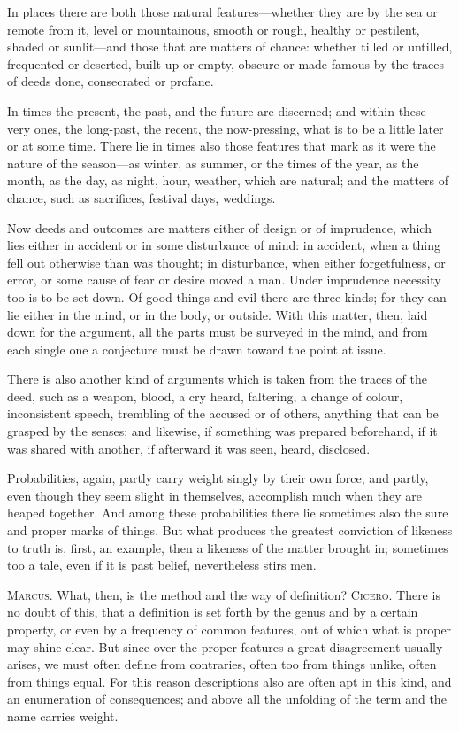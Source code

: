  In places there are both those natural features—whether they are by the sea or remote from it, level or mountainous, smooth or rough, healthy or pestilent, shaded or sunlit—and those that are matters of chance: whether tilled or untilled, frequented or deserted, built up or empty, obscure or made famous by the traces of deeds done, consecrated or profane.

 In times the present, the past, and the future are discerned; and within these very ones, the long-past, the recent, the now-pressing, what is to be a little later or at some time. There lie in times also those features that mark as it were the nature of the season—as winter, as summer, or the times of the year, as the month, as the day, as night, hour, weather, which are natural; and the matters of chance, such as sacrifices, festival days, weddings.

 Now deeds and outcomes are matters either of design or of imprudence, which lies either in accident or in some disturbance of mind: in accident, when a thing fell out otherwise than was thought; in disturbance, when either forgetfulness, or error, or some cause of fear or desire moved a man. Under imprudence necessity too is to be set down. Of good things and evil there are three kinds; for they can lie either in the mind, or in the body, or outside. With this matter, then, laid down for the argument, all the parts must be surveyed in the mind, and from each single one a conjecture must be drawn toward the point at issue.

 There is also another kind of arguments which is taken from the traces of the deed, such as a weapon, blood, a cry heard, faltering, a change of colour, inconsistent speech, trembling of the accused or of others, anything that can be grasped by the senses; and likewise, if something was prepared beforehand, if it was shared with another, if afterward it was seen, heard, disclosed.

 Probabilities, again, partly carry weight singly by their own force, and partly, even though they seem slight in themselves, accomplish much when they are heaped together. And among these probabilities there lie sometimes also the sure and proper marks of things. But what produces the greatest conviction of likeness to truth is, first, an example, then a likeness of the matter brought in; sometimes too a tale, even if it is past belief, nevertheless stirs men.

 \textsc{Marcus.} What, then, is the method and the way of definition? \textsc{Cicero.} There is no doubt of this, that a definition is set forth by the genus and by a certain property, or even by a frequency of common features, out of which what is proper may shine clear. But since over the proper features a great disagreement usually arises, we must often define from contraries, often too from things unlike, often from things equal. For this reason descriptions also are often apt in this kind, and an enumeration of consequences; and above all the unfolding of the term and the name carries weight.

